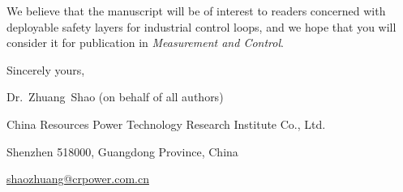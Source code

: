 \documentclass[11pt,a4paper]{article}
\begin{document}
We believe that the manuscript will be of interest to readers concerned with deployable safety layers for industrial control loops, and we hope that you will consider it for publication in \emph{Measurement and Control}.

\vspace{1em}
\begin{flushright}
Sincerely yours,

Dr.~Zhuang~Shao (on behalf of all authors)

China Resources Power Technology Research Institute Co., Ltd.

Shenzhen 518000, Guangdong Province, China

\href{mailto:shaozhuang@crpower.com.cn}{shaozhuang@crpower.com.cn}
\end{flushright}
\end{document}
